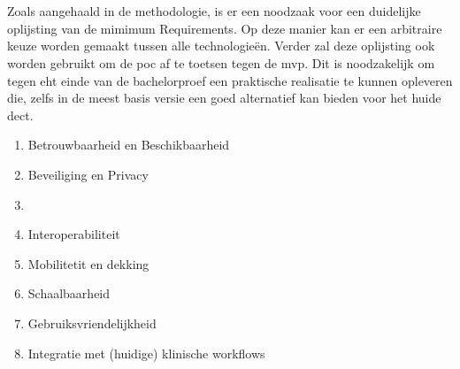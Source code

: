 \chapter{}%
\label{ch:minreq}

Zoals aangehaald in de methodologie, is er een noodzaak voor een duidelijke oplijsting van de mimimum Requirements. Op deze manier kan er een arbitraire keuze worden gemaakt tussen alle technologieën. Verder zal deze oplijsting ook worden gebruikt om de \acrshort{poc} af te toetsen tegen de \acrshort{mvp}. Dit is noodzakelijk om tegen eht einde van de bachelorproef een praktische realisatie te kunnen opleveren die, zelfs in de meest basis versie een goed alternatief kan bieden voor het huide \acrshort{dect}.

\begin{enumerate}
    \item Betrouwbaarheid en Beschikbaarheid
    \item Beveiliging en Privacy
    \item {}
    \item Interoperabiliteit
    \item Mobilitetit en dekking
    \item Schaalbaarheid
    \item Gebruiksvriendelijkheid
    \item Integratie met (huidige) klinische workflows
\end{enumerate}

\subsection{}

\subsection{}

\subsection{}

\subsection{}

